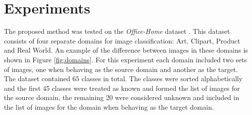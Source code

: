 \documentclass[10pt,twocolumn,letterpaper]{article}
\begin{document}
\section{Experiments}
\label{sec:experiments}

The proposed method was tested on the \textit{Office-Home} dataset \cite{OfficeHome}. This dataset consists of four separate domains for image classification: Art, Clipart, Product and Real World. An example of the difference between images in these domains is shown in Figure \ref{fig:domains}. For this experiment each domain included two sets of images, one when behaving as the source domain and another as the target. The dataset contained 65 classes in total.  The classes were sorted alphabetically and the first 45 classes were treated as known and formed the list of images for the source domain, the remaining 20 were considered unknown and included in the list of images for the domain when behaving as the target domain.
\end{document}
